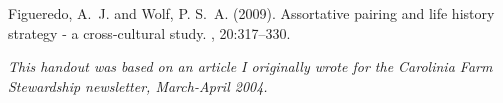\documentclass{tufte-handout}
\begin{document}
\begin{thebibliography}{99} %

Figueredo, A.~J. and Wolf, P. S.~A. (2009).
\newblock Assortative pairing and life history strategy - a cross-cultural
  study.
, 20:317--330.
 
\end{thebibliography}

\vspace{1cm}

\emph{This handout was based on an article I originally wrote for the Carolinia Farm Stewardship newsletter, March-April 2004.}
\end{document}
